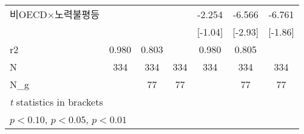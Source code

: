 \begin{tabular}{l*{6}{c}}
\addlinespace
비OECD$\times$노력불평등&                     &                     &                     &      -2.254         &      -6.566\sym{***}&      -6.761\sym{*}  \\
                    &                     &                     &                     &     [-1.04]         &     [-2.93]         &     [-1.86]         \\
\midrule
r2                  &       0.980         &       0.803         &                     &       0.980         &       0.805         &                     \\
N                   &         334         &         334         &         334         &         334         &         334         &         334         \\
N\_g                 &                     &          77         &          77         &                     &          77         &          77         \\
\bottomrule
\multicolumn{7}{l}{\footnotesize \textit{t} statistics in brackets}\\
\multicolumn{7}{l}{\footnotesize \sym{*} \(p<0.10\), \sym{**} \(p<0.05\), \sym{***} \(p<0.01\)}\\
\end{tabular}
